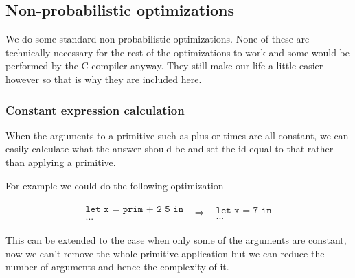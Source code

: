 \documentclass[a4paper]{article}
\newcommand{\optimization}[2]{
	\[
		\begin{array}{rcl}
			#1 & \Rightarrow & #2
		\end{array}
	\]
}
\begin{document}

\subsection{Non-probabilistic optimizations}

We do some standard non-probabilistic optimizations. None of these are technically necessary for the rest of the optimizations to work and some would be performed by the C compiler anyway. They still make our life a little easier however so that is why they are included here.




\subsubsection{Constant expression calculation}

When the arguments to a primitive such as plus or times are all constant, we can easily calculate what the answer should be and set the id equal to that rather than applying a primitive.

For example we could do the following optimization
\optimization{
	\begin{array}{l}
		\texttt{let x = prim + 2 5 in} \\
		\texttt{...}
	\end{array}
}{
	\begin{array}{l}
		\texttt{let x = 7 in} \\
		\texttt{...}
	\end{array}
}
This can be extended to the case when only some of the arguments are constant, now we can't remove the whole primitive application but we can reduce the number of arguments and hence the complexity of it.
\end{document}
